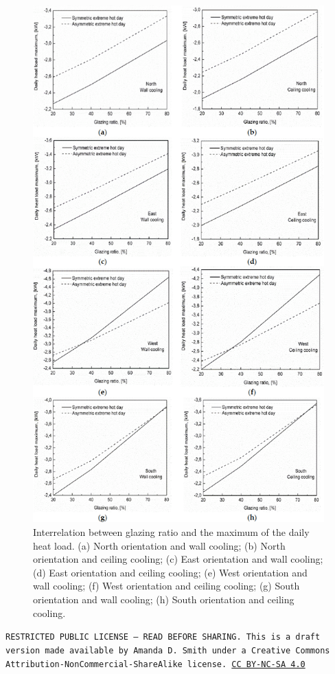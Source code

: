 \documentclass[10pt]{article}
\begin{document}
            \begin{figure}[h]
     \centering
            \includegraphics[width=5in]{extras16/glazingratio.png}
            \caption{\footnotesize{Interrelation between glazing ratio and the maximum of the daily heat load. (a) North
orientation and wall cooling; (b) North orientation and ceiling cooling; (c) East orientation and wall
cooling; (d) East orientation and ceiling cooling; (e) West orientation and wall cooling; (f) West
orientation and ceiling cooling; (g) South orientation and wall cooling; (h) South orientation and
ceiling cooling. \cite{L_Szabo2018-nh}}}
            \label{gr}
            \end{figure}


\bigskip

\noindent
\texttt{\footnotesize RESTRICTED PUBLIC LICENSE --- READ BEFORE SHARING. This is a draft version made available by Amanda D. Smith under a Creative Commons Attribution-NonCommercial-ShareAlike license. 
\href{https://creativecommons.org/licenses/by-nc-sa/4.0/}{CC BY-NC-SA 4.0}}


\printbibliography
\end{document}
